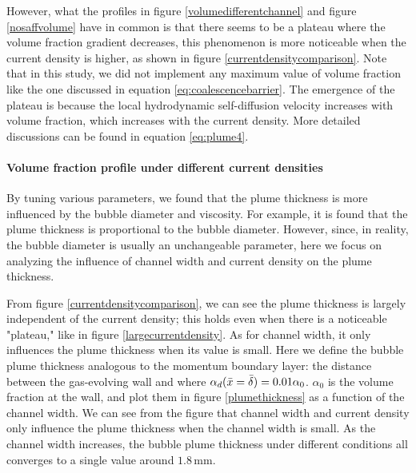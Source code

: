 However, what the profiles in figure \ref{volumedifferentchannel} and figure \ref{nosaffvolume} have in common is that there seems to be a plateau where the volume fraction gradient decreases, this phenomenon is more noticeable when the current density is higher, as shown in figure \ref{currentdensitycomparison}. Note that in this study, we did not implement any maximum value of volume fraction like the one discussed in equation \ref{eq:coalescencebarrier}. The emergence of the plateau is because the local hydrodynamic self-diffusion velocity increases with volume fraction, which increases with the current density. More detailed discussions can be found in equation \ref{eq:plume4}.






\paragraph{Volume fraction profile under different current densities}
\*


By tuning various parameters, we found that the plume thickness is more influenced by the bubble diameter and viscosity. For example, it is found that the plume thickness is proportional to the bubble diameter. However, since, in reality, the bubble diameter is usually an unchangeable parameter, here we focus on analyzing the influence of channel width and current density on the plume thickness.

From figure \ref{currentdensitycomparison}, we can see the plume thickness is largely independent of the current density; this holds even when there is a noticeable "plateau," like in figure \ref{largecurrentdensity}. As for channel width, it only influences the plume thickness when its value is small. Here we define the bubble plume thickness analogous to the momentum boundary layer: the distance between the gas-evolving wall and where $\alpha_d ( \Bar{x} = \Bar{\delta}) = 0.01\alpha_0$. $\alpha_0$ is the volume fraction at the wall, and plot them in figure \ref{plumethickness} as a function of the channel width. We can see from the figure that channel width and current density only influence the plume thickness when the channel width is small. As the channel width increases, the bubble plume thickness under different conditions all converges to a single value around $1.8 \, \mathrm{mm}$.

